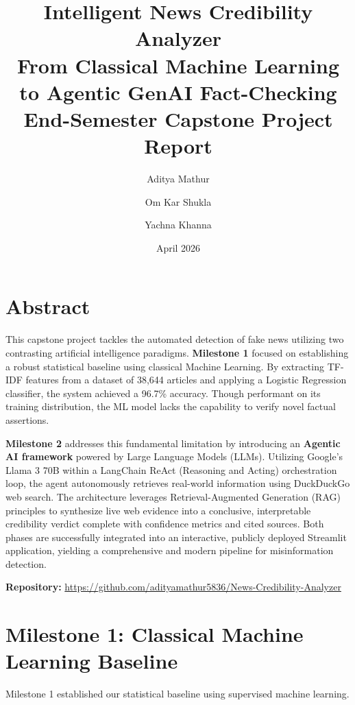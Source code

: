 \documentclass[12pt, a4paper]{article}
\title{
    \vspace{-1cm}
    \textbf{\LARGE Intelligent News Credibility Analyzer} \\[0.4cm]
    \large From Classical Machine Learning to Agentic GenAI Fact-Checking \\[0.3cm]
    \large End-Semester Capstone Project Report
}
\author{
    Aditya Mathur \and Om Kar Shukla \and Yachna Khanna
}
\date{April 2026}
\begin{document}
\maketitle
\thispagestyle{fancy}

\section{Abstract}

This capstone project tackles the automated detection of fake news utilizing two contrasting artificial intelligence paradigms. \textbf{Milestone 1} focused on establishing a robust statistical baseline using classical Machine Learning. By extracting TF-IDF features from a dataset of 38,644 articles and applying a Logistic Regression classifier, the system achieved a 96.7\% accuracy. Though performant on its training distribution, the ML model lacks the capability to verify novel factual assertions. 

\textbf{Milestone 2} addresses this fundamental limitation by introducing an \textbf{Agentic AI framework} powered by Large Language Models (LLMs). Utilizing Google's Llama 3 70B within a LangChain ReAct (Reasoning and Acting) orchestration loop, the agent autonomously retrieves real-world information using DuckDuckGo web search. The architecture leverages Retrieval-Augmented Generation (RAG) principles to synthesize live web evidence into a conclusive, interpretable credibility verdict complete with confidence metrics and cited sources. Both phases are successfully integrated into an interactive, publicly deployed Streamlit application, yielding a comprehensive and modern pipeline for misinformation detection.

\vspace{0.3cm}
\noindent\textbf{Repository:} \url{https://github.com/adityamathur5836/News-Credibility-Analyzer}

\section{Milestone 1: Classical Machine Learning Baseline}

Milestone 1 established our statistical baseline using supervised machine learning. 
\end{document}
